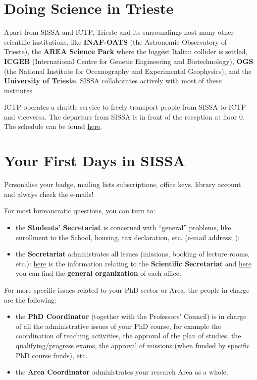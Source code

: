 \documentclass{sissavademecum}
\begin{document}
\section{Doing Science in Trieste}

Apart from SISSA and ICTP, Trieste and its surroundings host many other scientific institutions, like \textbf{INAF-OATS }(the Astronomic Observatory of Trieste), the \textbf{AREA Science Park} where the biggest Italian collider is settled, \textbf{ICGEB }(International Centre for Genetic Engineering and Biotechnology), \textbf{OGS }(the National Institute for Oceanography and Experimental Geophysics), and the \textbf{University of Trieste}. SISSA collaborates actively with most of these institutes.

ICTP operates a shuttle service to freely transport people from SISSA to ICTP and viceversa. The departure from SISSA is in front of the reception at floor $0$. The schedule can be found \href{https://www.ictp.it/visit-ictp/transportation/campus-shuttle-services.aspx#close}{here}.


\section{Your First Days in SISSA}

Personalise your badge, mailing lists subscriptions, office keys, library account and always check the e-mails!

\noindent For most bureaucratic questions, you can turn to:
\begin{itemize}
	\item the \textbf{Students' Secretariat} is concerned with ``general'' problems, like enrollment to the School, housing, tax declaration, etc. (e-mail address: );
	\item the \textbf{Secretariat} administrates all issues (missions, booking of lecture rooms, etc.): \href{https://www.sissa.it/scientific-secretariat}{here} is the information relating to the \textbf{Scientific Secretariat} and \href{https://www.sissa.it/articolazione-degli-uffici}{here} you can find the \textbf{general organization} of each office.
\end{itemize}
For more specific issues related to your PhD sector or Area, the people in charge are the following:
\begin{itemize}
	\item the \textbf{PhD Coordinator} (together with the Professors' Council) is in charge of all the administrative issues of your PhD course, for example the coordination of teaching activities, the approval of the plan of studies, the qualifying/progress exams, the approval of missions (when funded by specific PhD course funds), etc.
    \item the \textbf{Area Coordinator} administrates your research Area as a whole.
\end{itemize}
\end{document}
